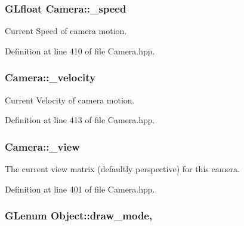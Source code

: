 \hypertarget{class_camera_a21f8eb53e5369018e39add0453ae626d}{
\subsubsection[{\-\_\-speed}]{\setlength{\rightskip}{0pt plus 5cm}G\-Lfloat Camera\-::\-\_\-speed\hspace{0.3cm}{\ttfamily [private]}}}\label{class_camera_a21f8eb53e5369018e39add0453ae626d}


Current Speed of camera motion. 



Definition at line 410 of file Camera.\-hpp.

\hypertarget{class_camera_aa15577ff9e67c81699ee86d4d20a7ee7}{
\subsubsection[{\-\_\-velocity}]{ Camera\-::\-\_\-velocity\hspace{0.3cm}{\ttfamily [private]}}}\label{class_camera_aa15577ff9e67c81699ee86d4d20a7ee7}


Current Velocity of camera motion. 



Definition at line 413 of file Camera.\-hpp.

\hypertarget{class_camera_a28f6e710df6db726568cd0f2bbd3643a}{
\subsubsection[{\-\_\-view}]{ Camera\-::\-\_\-view\hspace{0.3cm}{\ttfamily [private]}}}\label{class_camera_a28f6e710df6db726568cd0f2bbd3643a}


The current view matrix (defaultly perspective) for this camera. 



Definition at line 401 of file Camera.\-hpp.

\hypertarget{class_object_a82764b385767d989f27d301ab206acb8}{
\subsubsection[{draw\-\_\-mode}]{\setlength{\rightskip}{0pt plus 5cm}G\-Lenum Object\-::draw\-\_\-mode\hspace{0.3cm}{\ttfamily [protected]}, {\ttfamily [inherited]}}}\label{class_object_a82764b385767d989f27d301ab206acb8}


